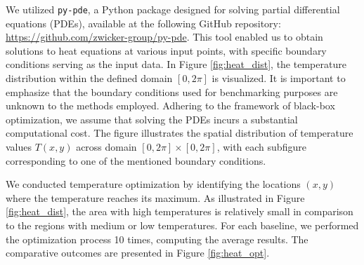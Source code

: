 We utilized \texttt{py-pde}, a Python package designed for solving partial differential equations (PDEs), available at the following GitHub repository: \url{https://github.com/zwicker-group/py-pde}. This tool enabled us to obtain solutions to heat equations at various input points, with specific boundary conditions serving as the input data. In Figure \ref{fig:heat_dist}, the temperature distribution within the defined domain $[0, 2\pi]$ is visualized. It is important to emphasize that the boundary conditions used for benchmarking purposes are unknown to the methods employed. Adhering to the framework of black-box optimization, we assume that solving the PDEs incurs a substantial computational cost. The figure illustrates the spatial distribution of temperature values $T(x,y)$ across domain $[0, 2\pi] \times [0, 2\pi]$, with each subfigure corresponding to one of the mentioned boundary conditions. 

We conducted temperature optimization by identifying the locations $(x,y)$ where the temperature reaches its maximum. As illustrated in Figure \ref{fig:heat_dist}, the area with high temperatures is relatively small in comparison to the regions with medium or low temperatures. For each baseline, we performed the optimization process 10 times, computing the average results. The comparative outcomes are presented in Figure \ref{fig:heat_opt}. 







